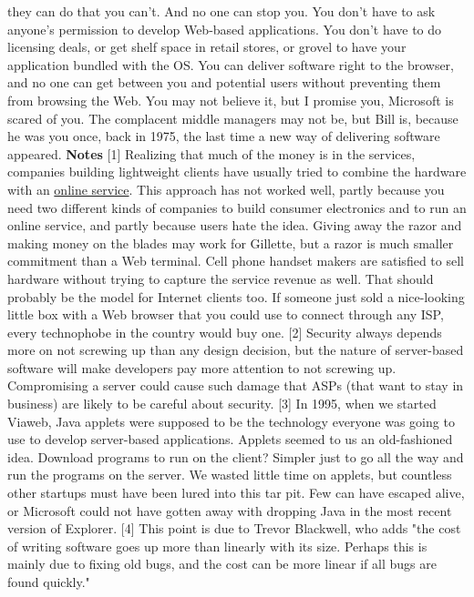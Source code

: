 they can do that you can't.  And no one can stop you.  You don't
have to ask anyone's permission to develop Web-based applications.
You don't have to do licensing deals, or get shelf space in retail
stores, or grovel to have your application bundled with the OS.
You can deliver software right to the browser, and no one can get
between you and potential users without preventing them from browsing
the Web.
You may not believe it, but I promise you, Microsoft is scared of
you.  The complacent middle managers may not be, but Bill is,
because he was you once, back in 1975, the last time a new way of
delivering software appeared.
\textbf{Notes}
[1] Realizing that much of the money is in the services, companies
building lightweight clients have usually tried to combine the
hardware with an 
\href{http://news.cnet.com/news/0-1006-200-3622600.html}{online service}. 
 This approach has not worked
well, partly because you need two different kinds of companies to
build consumer electronics and to run an online service, and partly
because users hate the idea.  Giving away the razor and making
money on the blades may work for Gillette, but a razor is much
smaller commitment than a Web terminal.  Cell phone handset makers
are satisfied to sell hardware without trying to capture the service
revenue as well.  That should probably be the model for Internet
clients too.  If someone just sold a nice-looking little box with
a Web browser that you could use to connect through any ISP, every
technophobe in the country would buy one.
[2] Security always depends more on not screwing up than any design
decision, but the nature of server-based software will make developers
pay more attention to not screwing up.  Compromising a server could
cause such damage that ASPs (that want to stay in business) are
likely to be careful about security.
[3] In 1995, when we started Viaweb, Java applets were supposed to
be the technology everyone was going to use to develop server-based
applications.  Applets seemed to us an old-fashioned idea.  Download
programs to run on the client? Simpler just to go all the way and
run the programs on the server.  We wasted little time
on applets, but countless other startups must have been lured into
this tar pit.  Few can have escaped alive, or Microsoft could not
have gotten away with dropping Java in the most recent version of
Explorer.
[4] This point is due to Trevor Blackwell, who adds "the cost of
writing software goes up more than linearly with its size.  Perhaps
this is mainly due to fixing old bugs, and the cost can be more
linear if all bugs are found quickly."
